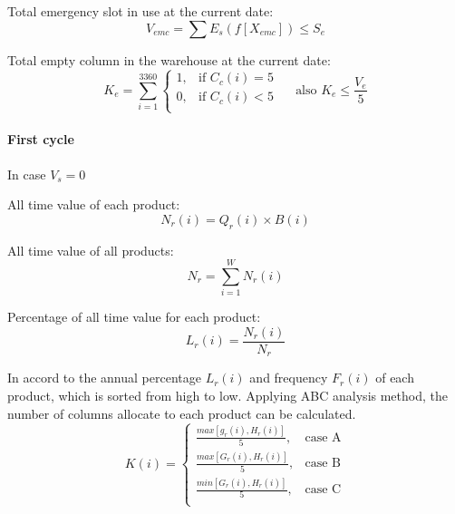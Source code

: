    Total emergency slot in use at the current date:
    \begin{equation}\label{eq:Vemc}
        V_{emc} = \sum E_s(f[X_{emc}]) \leq S_e
    \end{equation}

    Total empty column in the warehouse at the current date:
    \begin{equation}\label{eq:Ke}
        K_e = \sum_{i=1}^{3360}
        \begin{cases}
            1, & \text{if } C_c(i) = 5 \\
            0, & \text{if } C_c(i) < 5 \\
        \end{cases}
        \quad \text{ also } K_e \leq \frac{V_e}{5}
    \end{equation}

\paragraph{First cycle}\mbox{}

    In case ${ V_s = 0 }$
            
    All time value of each product:
    \begin{equation}\label{eq:Nri}
        N_r(i) = Q_r(i) \times B(i)
    \end{equation}

    All time value of all products:
    \begin{equation}\label{eq:Nr}
        N_r = \sum_{i=1}^{W} N_r(i) 
    \end{equation}

    Percentage of all time value for each product:
    \begin{equation}\label{eq:Lri}
        L_r(i) = \frac{N_r(i)}{N_r}
    \end{equation}

    In accord to the annual percentage ${ L_r(i) }$ and frequency ${ F_r(i) }$ of each product, which is sorted from high to low. Applying ABC analysis method, the number of columns allocate to each product can be calculated.
    \begin{equation}\label{eq:K}
        K(i) = 
        \begin{cases}
            \frac{max[g_r(i),H_r(i)]}{5}, & 
            \text{case A} \\
            \frac{max[G_r(i),H_r(i)]}{5}, & 
            \text{case B} \\
            \frac{min[G_r(i),H_r(i)]}{5}, & 
            \text{case C} \\
        \end{cases}
    \end{equation}

